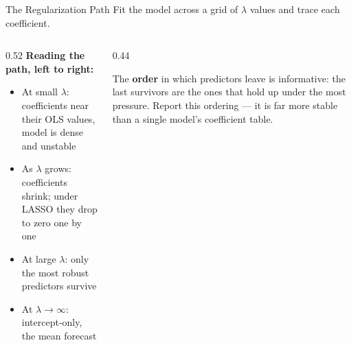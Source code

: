 \documentclass[aspectratio=169, 11pt]{beamer}
\begin{document}
\begin{frame}{The Regularization Path}
  Fit the model across a grid of $\lambda$ values and trace each coefficient.
  \begin{columns}[T]
    \begin{column}{0.52\textwidth}
      \textbf{Reading the path, left to right:}
      \begin{itemize}\small\itemsep0pt
        \item At small $\lambda$: coefficients near their OLS values, model
              is dense and unstable
        \item As $\lambda$ grows: coefficients shrink; under LASSO they drop
              to zero one by one
        \item At large $\lambda$: only the most robust predictors survive
        \item At $\lambda \to \infty$: intercept-only, the mean forecast
      \end{itemize}
    \end{column}
    \begin{column}{0.44\textwidth}
      \begin{keybox}
        \small The \textbf{order} in which predictors leave is informative:
        the last survivors are the ones that hold up under the most pressure.
        Report this ordering --- it is far more stable than a single
        model's coefficient table.
      \end{keybox}
    \end{column}
  \end{columns}
\end{frame}
\end{document}
